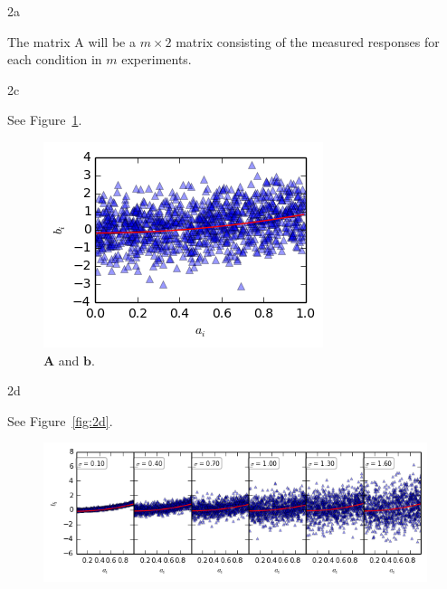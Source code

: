 \documentclass{article}
\begin{document}
\begin{homeworkProblem}

    \begin{homeworkSection}{2a}
        
        The matrix A will be a $m \times 2$ matrix consisting of the measured
        responses for each condition in $m$ experiments.

    \end{homeworkSection}

    \begin{homeworkSection}{2c}

                See Figure~\ref{fig:2c}.

        \begin{figure}[!ht]
            \begin{centering}
            \includegraphics[scale=1]{problem2c_fig.png}

            \caption{\label{fig:2c} $\bm{A}$ and $\bm{b}$.}
            
            \end{centering}
        \end{figure}

    \end{homeworkSection}

    \begin{homeworkSection}{2d}

                See Figure~\ref{fig:2d}.

        \begin{centering}
        \begin{figure}[!ht]
            \includegraphics[scale=1]{problem2d_fig.png}


\end{figure}
\end{centering}
\end{homeworkSection}
\end{homeworkProblem}
\end{document}
